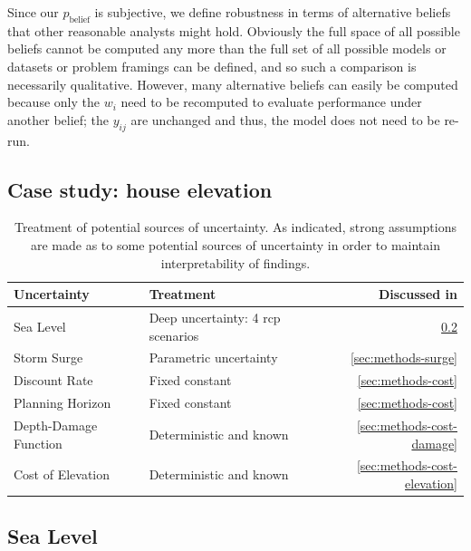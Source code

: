 \documentclass[12pt]{article}
\begin{document}
Since our $p_\text{belief}$ is subjective, we define robustness in terms of alternative beliefs that other reasonable analysts might hold.
Obviously the full space of all possible beliefs cannot be computed any more than the full set of all possible models or datasets or problem framings can be defined, and so such a comparison is necessarily qualitative.
However, many alternative beliefs can easily be computed because only the $w_i$ need to be recomputed to evaluate performance under another belief; the $y_{ij}$ are unchanged and thus, the model does not need to be re-run.

\subsection{Case study: house elevation}\label{sec:methods-case}

\begin{table}
    \centering
    \begin{tabular}{llr}
        \toprule
        Uncertainty           & Treatment                                    & Discussed in                      \\
        \midrule
        Sea Level             & Deep uncertainty: 4 \acrshort{rcp} scenarios & \cref{sec:methods-lsl}            \\
        Storm Surge           & Parametric uncertainty                       & \cref{sec:methods-surge}          \\
        Discount Rate         & Fixed constant                               & \cref{sec:methods-cost}           \\
        Planning Horizon      & Fixed constant                               & \cref{sec:methods-cost}           \\
        Depth-Damage Function & Deterministic and known                      & \cref{sec:methods-cost-damage}    \\
        Cost of Elevation     & Deterministic and known                      & \cref{sec:methods-cost-elevation} \\
        \bottomrule
    \end{tabular}
    \caption{
        Treatment of potential sources of uncertainty.
        As indicated, strong assumptions are made as to some potential sources of uncertainty in order to maintain interpretability of findings.
    }\label{sec:tab-uncertainties}
\end{table}

\subsection{Sea Level}\label{sec:methods-lsl}
\end{document}
